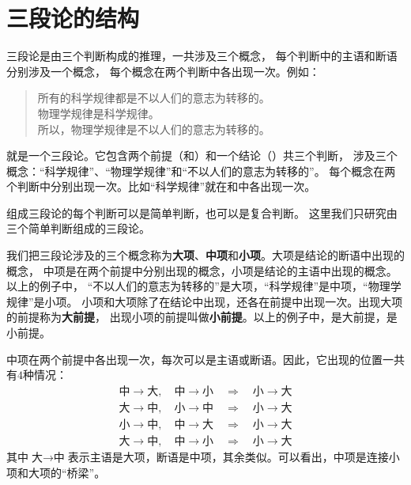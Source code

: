 \documentclass[12pt,UTF8]{ctexbook}
\begin{document}
\section{三段论的结构}
三段论是由三个判断构成的推理，一共涉及三个概念，
每个判断中的主语和断语分别涉及一个概念，
每个概念在两个判断中各出现一次。例如：
\begin{quotation}
    \noindent {}所有的科学规律都是不以人们的意志为转移的。\\
    物理学规律是科学规律。\\
    所以，物理学规律是不以人们的意志为转移的。
\end{quotation}
就是一个三段论。它包含两个前提（和）和一个结论（）共三个判断，
涉及三个概念：“科学规律”、“物理学规律”和“不以人们的意志为转移的”。
每个概念在两个判断中分别出现一次。比如“科学规律”就在和中各出现一次。

组成三段论的每个判断可以是简单判断，也可以是复合判断。
这里我们只研究由三个简单判断组成的三段论。

我们把三段论涉及的三个概念称为\textbf{大项}、\textbf{中项}和\textbf{小项}。大项是结论的断语中出现的概念，
中项是在两个前提中分别出现的概念，小项是结论的主语中出现的概念。以上的例子中，
“不以人们的意志为转移的”是大项，“科学规律”是中项，“物理学规律”是小项。
小项和大项除了在结论中出现，还各在前提中出现一次。出现大项的前提称为\textbf{大前提}，
出现小项的前提叫做\textbf{小前提}。以上的例子中，是大前提，是小前提。

中项在两个前提中各出现一次，每次可以是主语或断语。因此，它出现的位置一共有$4$种情况：
\begin{align*}
    \mbox{中} \rightarrow \mbox{大}, \quad \mbox{中} \rightarrow \mbox{小} \quad \Rightarrow \quad \mbox{小} \rightarrow \mbox{大}  \\
    \mbox{大} \rightarrow \mbox{中}, \quad \mbox{小} \rightarrow \mbox{中} \quad \Rightarrow \quad \mbox{小} \rightarrow \mbox{大}  \\
    \mbox{小} \rightarrow \mbox{中}, \quad \mbox{中} \rightarrow \mbox{大} \quad \Rightarrow \quad \mbox{小} \rightarrow \mbox{大}  \\
    \mbox{大} \rightarrow \mbox{中}, \quad \mbox{中} \rightarrow \mbox{小} \quad \Rightarrow \quad \mbox{小} \rightarrow \mbox{大} 
\end{align*}
其中$\mbox{大} \rightarrow \mbox{中}$表示主语是大项，断语是中项，其余类似。可以看出，中项是连接小项和大项的“桥梁”。
\end{document}
